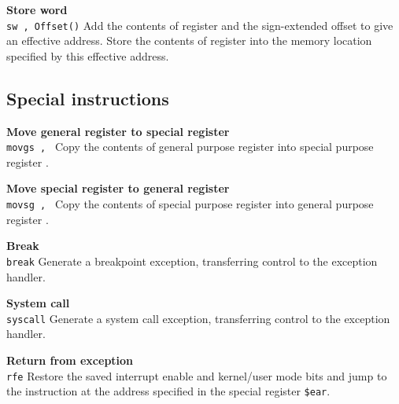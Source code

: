 \noindent
{\bf Store word}\\
\noindent
\texttt{sw \regd, Offset(\regs{})}
Add the contents of register \regs{} and the sign-extended offset to
give an effective address. Store the contents of register \regd{} into
the memory location specified by this effective address.
\vspace{3ex}
\newpage

\subsection{Special instructions}

\noindent
{\bf Move general register to special register}\\
\noindent
\texttt{movgs \regd, \regs}
Copy the contents of general purpose register \regs{} into special purpose register \regd{}.
\vspace{3ex}

\noindent
{\bf Move special register to general register}\\
\noindent
\texttt{movsg \regd, \regs}
Copy the contents of special purpose register \regs{} into general purpose register \regd{}.
\vspace{3ex}

\noindent
{\bf Break}\\
\noindent
\texttt{break}
Generate a breakpoint exception, transferring control to the exception handler.
\vspace{3ex}

\noindent
{\bf System call}\\
\noindent
\texttt{syscall}
Generate a system call exception, transferring control to the exception handler.
\vspace{3ex}

\noindent
{\bf Return from exception}\\
\noindent
\texttt{rfe}
Restore the saved interrupt enable and kernel/user mode bits and jump to
the instruction at the address specified in the special register \texttt{\$ear}.
\vspace{3ex}
